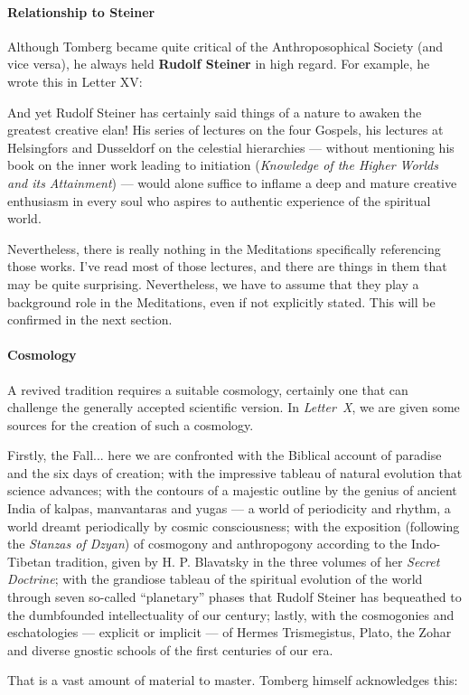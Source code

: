 \paragraph{Relationship to Steiner}
Although Tomberg became quite critical of the Anthroposophical Society (and vice versa), he always held \textbf{Rudolf
Steiner} in high regard. For example, he wrote this in Letter XV:

\begin{quotationx}
And yet Rudolf Steiner has certainly said things of a nature to awaken the greatest creative elan! His series of
lectures on the four Gospels, his lectures at Helsingfors and Dusseldorf on the celestial hierarchies — without mentioning his book on the inner work leading to initiation (\emph{Knowledge of the Higher Worlds and its
Attainment}) — would alone suffice to inflame a deep and mature creative enthusiasm in every soul who
aspires to authentic experience of the spiritual world. 

\end{quotationx}
Nevertheless, there is really nothing in the Meditations specifically referencing those works. I've read
most of those lectures, and there are things in them that may be quite surprising. Nevertheless, we have to assume that
they play a background role in the Meditations, even if not explicitly stated. This will be confirmed in the next
section.

\paragraph{Cosmology}
A revived tradition requires a suitable cosmology, certainly one that can challenge the generally accepted scientific
version. In \textit{Letter~X}, we are given some sources for the creation of such a cosmology.

\begin{quotationx}
Firstly, the Fall... here we are confronted with the Biblical account of paradise and the six days of creation; with
the impressive tableau of natural evolution that science advances; with the contours of a majestic outline by the
genius of ancient India of kalpas, manvantaras and yugas — a world of periodicity and rhythm, a world
dreamt periodically by cosmic consciousness; with the exposition (following the \emph{Stanzas of Dzyan}) of cosmogony
and anthropogony according to the Indo-Tibetan tradition, given by H. P. Blavatsky in the three volumes of her
\emph{Secret Doctrine}; with the grandiose tableau of the spiritual evolution of the world through seven so-called
“planetary” phases that Rudolf Steiner has bequeathed to the dumbfounded intellectuality of our century; lastly, with
the cosmogonies and eschatologies — explicit or implicit — of Hermes Trismegistus, Plato, the
Zohar and diverse gnostic schools of the first centuries of our era. 

\end{quotationx}
That is a vast amount of material to master. Tomberg himself acknowledges this:

